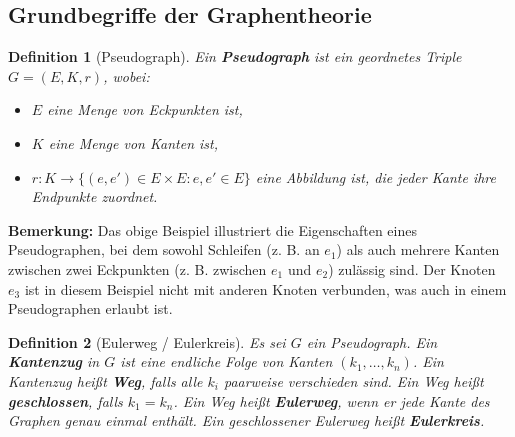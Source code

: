 \documentclass[a4paper,12pt]{article}
\theoremstyle{break}
\newtheorem{definition}{Definition}[section]
\begin{document}
\subsection{Grundbegriffe der Graphentheorie}

\begin{definition}[Pseudograph]
Ein \textbf{Pseudograph} ist ein geordnetes Triple \( G = (E, K, r) \), wobei:
\begin{itemize}
    \item \( E \) eine Menge von Eckpunkten ist,
    \item \( K \) eine Menge von Kanten ist,
    \item \( r: K \to \{(e, e') \in E \times E : e, e' \in E\} \) eine Abbildung ist, die jeder Kante ihre Endpunkte zuordnet.
\end{itemize}
\end{definition}

\begin{center}
\end{center}

\textbf{Bemerkung:} Das obige Beispiel illustriert die Eigenschaften eines Pseudographen, bei dem sowohl Schleifen (z. B. an \(e_1\)) als auch mehrere Kanten zwischen zwei Eckpunkten (z. B. zwischen \(e_1\) und \(e_2\)) zulässig sind. Der Knoten \( e_3 \) ist in diesem Beispiel nicht mit anderen Knoten verbunden, was auch in einem Pseudographen erlaubt ist.

\begin{definition}[Eulerweg / Eulerkreis]
Es sei \( G \) ein Pseudograph. Ein \textbf{Kantenzug} in \( G \) ist eine endliche Folge von Kanten \( (k_1, \dots, k_n) \). Ein Kantenzug heißt \textbf{Weg}, falls alle \( k_i \) paarweise verschieden sind. Ein Weg heißt \textbf{geschlossen}, falls \( k_1 = k_n \). Ein Weg heißt \textbf{Eulerweg}, wenn er jede Kante des Graphen genau einmal enthält. Ein geschlossener Eulerweg heißt \textbf{Eulerkreis}.
\end{definition}
\end{document}
